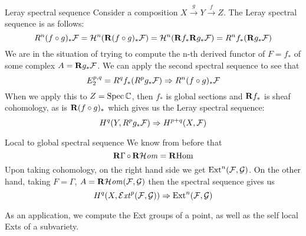 \begin{example}{Leray spectral sequence}{} Consider a composition $X\xrightarrow{g}Y\xrightarrow{f}Z$. The Leray spectral sequence is as follows:
\begin{equation*}
    R^n(f\circ g)_*\mathcal{F}
        = \mathcal{H}^n(\mathbf{R}(f\circ g)_*\mathcal{F})
        = \mathcal{H}^n(\mathbf{R} f_*\mathbf{R} g_*\mathcal{F})
        = R^nf_*(\mathbf{R} g_*\mathcal{F})
\end{equation*}
We are in the situation of trying to compute the n-th derived functor of $F=f_*$ of some complex $A=\mathbf{R} g_*\mathcal{F}$. We can apply the second spectral sequence to see that
\begin{equation*}
    E_2^{p,q}
        = R^qf_*(R^pg_*\mathcal{F})
        \Rightarrow R^n(f\circ g)_*\mathcal{F}
\end{equation*}
When we apply this to $Z=\operatorname{Spec}\mathbb{C}$, then $f_*$ is global sections and $\mathbf{R} f_*$ is sheaf cohomology, as is $\mathbf{R}(f\circ g)_*$ which gives us the Leray spectral sequence:
\begin{equation*}
    H^q(Y,R^pg_*\mathcal{F}) \Rightarrow H^{p+q}(X,\mathcal{F})
\end{equation*}
\end{example}

\begin{example}{Local to global spectral sequence}{}
We know from before that
\begin{equation*}
    \operatorname{\mathbf{R}\Gamma}\circ\operatorname{\mathbf{R}\mathcal{H}\mathit{om}} = \operatorname{\mathbf{R} Hom}
\end{equation*}
Upon taking cohomology, on the right hand side we get $\operatorname{Ext}^n(\mathcal{F},\mathcal{G})$. On the other hand, taking $F=\Gamma$, $A=\operatorname{\mathbf{R}\mathcal{H}\mathit{om}}(\mathcal{F},\mathcal{G})$ then the spectral sequence gives us
\begin{equation*}
    H^q(X,\operatorname{\mathcal{E}\mathit{xt}}^p(\mathcal{F},\mathcal{G})) \Rightarrow \operatorname{Ext}^n(\mathcal{F},\mathcal{G})
\end{equation*}
\end{example}

As an application, we compute the Ext groups of a point, as well as the self local Exts of a subvariety.

